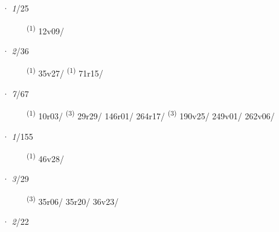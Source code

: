 \noindent{} · \textit{1}/25 \LEMMALINE
\begin{description}
    \item[]  \textsuperscript{(1)} \mbox{12v09/}
\end{description}
\ENTRYEND
\noindent{} · \textit{2}/36 \LEMMALINE
\begin{description}
    \item[]  \textsuperscript{(1)} \mbox{35v27/} \textsuperscript{(1)} \mbox{71r15/}
\end{description}
\ENTRYEND
\noindent{} · \textit{7}/67 \LEMMALINE
\begin{description}
    \item[]  \textsuperscript{(1)} \mbox{10r03/} \textsuperscript{(3)} \mbox{29r29/} \mbox{146r01/} \mbox{264r17/} \textsuperscript{(3)} \mbox{190v25/} \mbox{249v01/} \mbox{262v06/}
\end{description}
\ENTRYEND
\noindent{} · \textit{1}/155 \LEMMALINE
\begin{description}
    \item[]  \textsuperscript{(1)} \mbox{46v28/}
\end{description}
\ENTRYEND
\noindent{} · \textit{3}/29 \LEMMALINE
\begin{description}
    \item[]  \textsuperscript{(3)} \mbox{35r06/} \mbox{35r20/} \mbox{36v23/}
\end{description}
\ENTRYEND
\noindent{} · \textit{2}/22 \LEMMALINE
